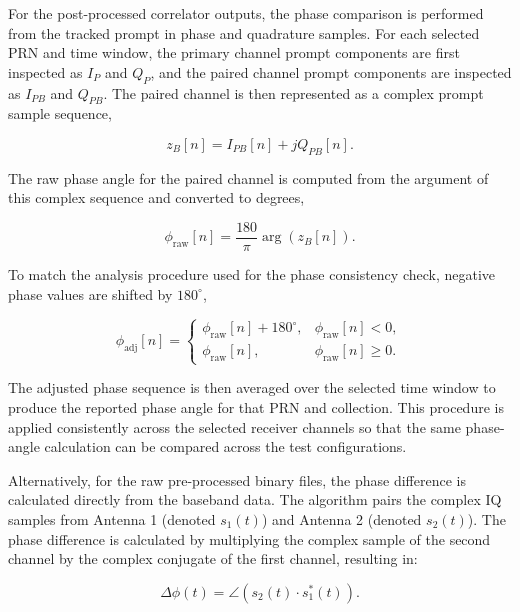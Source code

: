\documentclass[conference]{IEEEtran}
\begin{document}
For the post-processed correlator outputs, the phase comparison is performed from the tracked prompt in phase and quadrature samples. For each selected PRN and time window, the primary channel prompt components are first inspected as $I_P$ and $Q_P$, and the paired channel prompt components are inspected as $I_{PB}$ and $Q_{PB}$. The paired channel is then represented as a complex prompt sample sequence,

\begin{equation}
z_B[n] = I_{PB}[n] + jQ_{PB}[n].
\end{equation}

The raw phase angle for the paired channel is computed from the argument of this complex sequence and converted to degrees,

\begin{equation}
\phi_{\mathrm{raw}}[n] =
\frac{180}{\pi}\arg\left(z_B[n]\right).
\end{equation}

To match the analysis procedure used for the phase consistency check, negative phase values are shifted by $180^\circ$,

\begin{equation}
\phi_{\mathrm{adj}}[n] =
\begin{cases}
\phi_{\mathrm{raw}}[n] + 180^\circ, & \phi_{\mathrm{raw}}[n] < 0,\\
\phi_{\mathrm{raw}}[n], & \phi_{\mathrm{raw}}[n] \geq 0.
\end{cases}
\end{equation}

The adjusted phase sequence is then averaged over the selected time window to produce the reported phase angle for that PRN and collection. This procedure is applied consistently across the selected receiver channels so that the same phase-angle calculation can be compared across the test configurations.

Alternatively, for the raw pre-processed binary files, the phase difference is calculated directly from the baseband data. The algorithm pairs the complex IQ samples from Antenna 1 (denoted $s_1(t)$) and Antenna 2 (denoted $s_2(t)$). The phase difference is calculated by multiplying the complex sample of the second channel by the complex conjugate of the first channel, resulting in:

\begin{equation}
\Delta\phi(t) = \angle(s_2(t) \cdot s_1^*(t)).
\end{equation}
\end{document}
